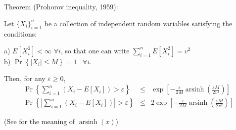 \documentclass[12pt]{article}
\DeclareMathOperator{\arsinh}{arsinh}
\begin{document}
Theorem (Prohorov inequality, 1959):

Let $\{X_{i}\}_{i=1}^{n}$ be a collection of independent random
variables satisfying the conditions:

a) $E[X_{i}^{2}]<\infty $ $\forall i$, so that one can write $%
\sum_{i=1}^{n}E[X_{i}^{2}]=v^{2}$ \\
b) $\Pr\left\{\left\vert X_{i}\right\vert \leq M\right\} =1$ \ $\forall i$.

Then, for any $\varepsilon \geq 0$,
\begin{eqnarray*}
\Pr\left\{ \sum_{i=1}^{n}\left( X_{i}-E[X_{i}]\right) >\varepsilon \right\}
&\leq &\exp \left[ -\frac{\varepsilon }{2M}\arsinh\left( \frac{\varepsilon
M}{2v^{2}}\right) \right] \\
\Pr\left\{ \left\vert \sum_{i=1}^{n}\left( X_{i}-E[X_{i}]\right) \right\vert
>\varepsilon \right\} &\leq &2\exp \left[ -\frac{\varepsilon }{2M}\arsinh\left( \frac{\varepsilon M}{2v^{2}}\right) \right]
\end{eqnarray*}

(See  for the meaning of $\arsinh(x)$)
\end{document}
